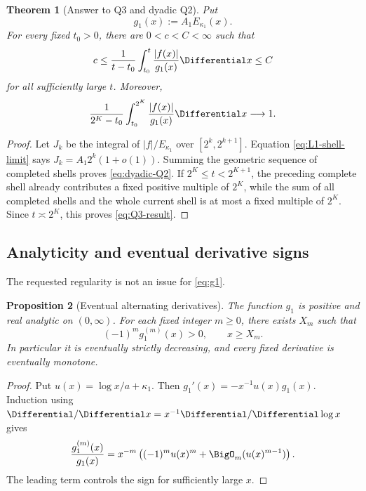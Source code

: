 \documentclass[11pt,oneside]{article}
\newtheorem{theorem}{Theorem}[section]
\newtheorem{proposition}[theorem]{Proposition}
\theoremstyle{definition}
\theoremstyle{remark}
\begin{document}
\begin{theorem}[Answer to Q3 and dyadic Q2]
\label{thm:Q3}
Put
\begin{equation}
 g_1(x):=A_1E_{\kappa_1}(x).
 \label{eq:g1}
\end{equation}
For every fixed $t_0>0$, there are $0<c<C<\infty$ such that
\begin{equation}
 c\le
 \frac1{t-t_0}\int_{t_0}^{t}\frac{|f(x)|}{g_1(x)}\Differential x
 \le C
 \label{eq:Q3-result}
\end{equation}
for all sufficiently large $t$.  Moreover,
\begin{equation}
 \frac1{2^K-t_0}\int_{t_0}^{2^K}
 \frac{|f(x)|}{g_1(x)}\Differential x\longrightarrow1.
 \label{eq:dyadic-Q2}
\end{equation}
\end{theorem}

\begin{proof}
Let $J_k$ be the integral of $|f|/E_{\kappa_1}$ over
$[2^k,2^{k+1}]$.  Equation \eqref{eq:L1-shell-limit} says
$J_k=A_1 2^k(1+o(1))$.  Summing the geometric sequence of completed shells
proves \eqref{eq:dyadic-Q2}.  If $2^K\le t<2^{K+1}$, the preceding complete
shell already contributes a fixed positive multiple of $2^K$, while the sum
of all completed shells and the whole current shell is at most a fixed
multiple of $2^K$.  Since $t\asymp2^K$, this proves \eqref{eq:Q3-result}.
\end{proof}

\subsection{Analyticity and eventual derivative signs}

The requested regularity is not an issue for \eqref{eq:g1}.

\begin{proposition}[Eventual alternating derivatives]
\label{prop:derivatives}
The function $g_1$ is positive and real analytic on $(0,\infty)$.  For each
fixed integer $m\ge0$, there exists $X_m$ such that
\begin{equation}
 (-1)^m g_1^{(m)}(x)>0,
 \qquad x\ge X_m.
 \label{eq:alternating-derivatives}
\end{equation}
In particular it is eventually strictly decreasing, and every fixed
derivative is eventually monotone.
\end{proposition}

\begin{proof}
Put $u(x)=\log x/a+\kappa_1$.  Then
$g_1'(x)=-x^{-1}u(x)g_1(x)$.  Induction using
$\Differential/\Differential x=x^{-1}\Differential/\Differential\log x$ gives
\begin{equation}
 \frac{g_1^{(m)}(x)}{g_1(x)}
 =x^{-m}\left((-1)^m u(x)^m+\BigO_m(u(x)^{m-1})\right).
 \label{eq:derivative-asymptotic}
\end{equation}
The leading term controls the sign for sufficiently large $x$.
\end{proof}
\end{document}
